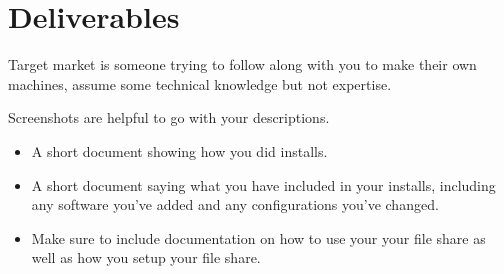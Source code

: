 \documentclass[12pt]{article}
\begin{document}
\section*{Deliverables}

Target market is someone trying to follow along with you to make their own machines, assume some technical knowledge but not expertise. 

Screenshots are helpful to go with your descriptions.

\begin{itemize}
    \item A short document showing how you did installs.
    \item A short document saying what you have included in your installs, including any software you've added and any configurations you've changed. 
    \item Make sure to include documentation on how to use your your file share as well as how you setup your file share.
\end{itemize}
 
\end{document}
